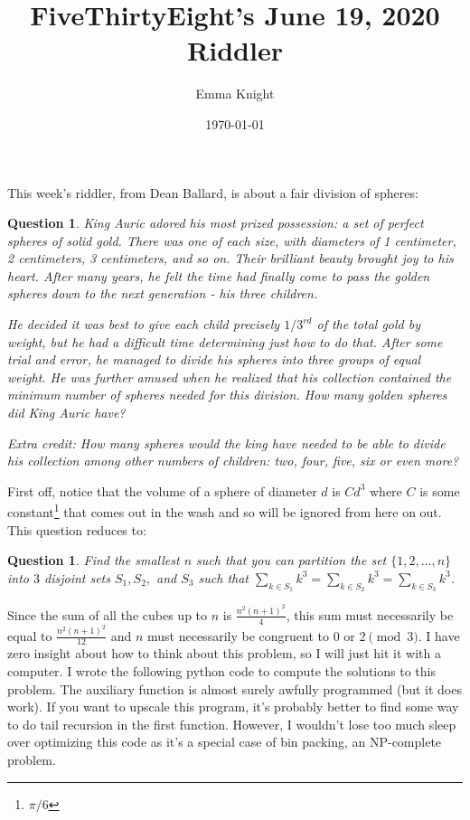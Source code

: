 \documentclass[11pt]{article}
\title{FiveThirtyEight's June 19, 2020 Riddler}
\author{Emma Knight}
\date{\today}
\newtheorem{question}[theorem]{Question}
\theoremstyle{definition}
\begin{document}
\maketitle
This week's riddler, from Dean Ballard, is about a fair division of spheres:
\begin{question}
King Auric adored his most prized possession: a set of perfect spheres of solid gold. There was one of each size, with diameters of 1 centimeter, 2 centimeters, 3 centimeters, and so on. Their brilliant beauty brought joy to his heart. After many years, he felt the time had finally come to pass the golden spheres down to the next generation - his three children.

He decided it was best to give each child precisely $1/3^{rd}$ of the total gold by weight, but he had a difficult time determining just how to do that. After some trial and error, he managed to divide his spheres into three groups of equal weight. He was further amused when he realized that his collection contained the minimum number of spheres needed for this division. How many golden spheres did King Auric have?

Extra credit: How many spheres would the king have needed to be able to divide his collection among other numbers of children: two, four, five, six or even more?
\end{question}
First off, notice that the volume of a sphere of diameter $d$ is $Cd^3$ where $C$ is some constant\footnote{$\pi/6$} that comes out in the wash and so will be ignored from here on out.  This question reduces to:
\begin{question}
Find the smallest $n$ such that you can partition the set $\{1, 2, \ldots, n\}$ into $3$ disjoint sets $S_1, S_2,$ and $S_3$ such that $\displaystyle{\sum_{k \in S_1} k^3 = \sum_{k \in S_2} k^3 = \sum_{k \in S_3} k^3}$.
\end{question}
Since the sum of all the cubes up to $n$ is $\frac{n^2(n+1)^2}{4}$, this sum must necessarily be equal to $\frac{n^2(n+1)^2}{12}$ and $n$ must necessarily be congruent to $0$ or $2 \pmod{3}$.  I have zero insight about how to think about this problem, so I will just hit it with a computer.  I wrote the following python code to compute the solutions to this problem.  The auxiliary function is almost surely awfully programmed (but it does work).  If you want to upscale this program, it's probably better to find some way to do tail recursion in the first function.  However, I wouldn't lose too much sleep over optimizing this code as it's a special case of bin packing, an NP-complete problem.
\end{document}
